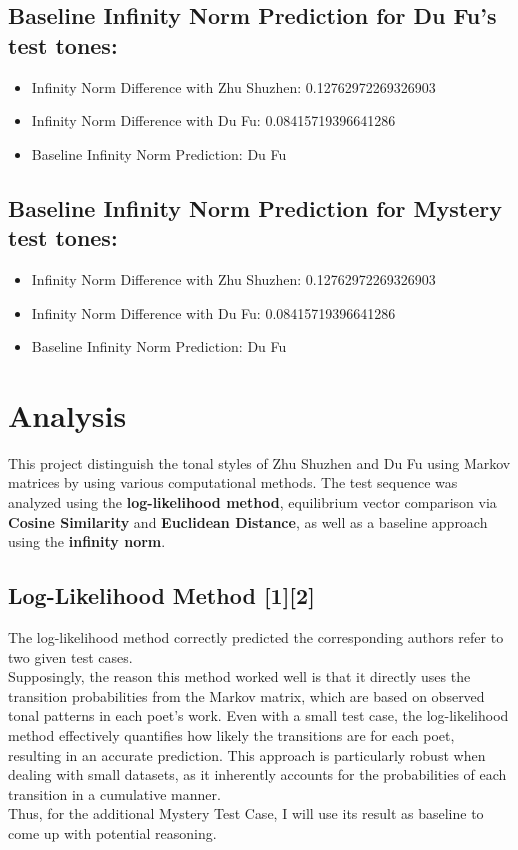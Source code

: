 \documentclass[12pt]{article}
\begin{document}
\subsection*{Baseline Infinity Norm Prediction for Du Fu's test tones:}


\begin{itemize}
    \item Infinity Norm Difference with Zhu Shuzhen: 0.12762972269326903
    \item Infinity Norm Difference with Du Fu: 0.08415719396641286
    \item Baseline Infinity Norm Prediction: Du Fu
\end{itemize}

\subsection*{Baseline Infinity Norm Prediction for Mystery test tones:}


\begin{itemize}
    \item Infinity Norm Difference with Zhu Shuzhen: 0.12762972269326903
    \item Infinity Norm Difference with Du Fu: 0.08415719396641286
    \item Baseline Infinity Norm Prediction: Du Fu
\end{itemize}

\section{Analysis}
This project distinguish the tonal styles of Zhu Shuzhen and Du Fu using Markov matrices by using various computational methods. The test sequence was analyzed using the \textbf{log-likelihood method}, equilibrium vector comparison via \textbf{Cosine Similarity} and \textbf{Euclidean Distance}, as well as a baseline approach using the \textbf{infinity norm}.

\subsection*{Log-Likelihood Method [1][2]}

The log-likelihood method correctly predicted the corresponding authors refer to two given test cases.
\\
Supposingly, the reason this method worked well is that it directly uses the transition probabilities from the Markov matrix, which are based on observed tonal patterns in each poet's work. Even with a small test case, the log-likelihood method effectively quantifies how likely the transitions are for each poet, resulting in an accurate prediction. 
This approach is particularly robust when dealing with small datasets, as it inherently accounts for the probabilities of each transition in a cumulative manner.
\\
Thus, for the additional Mystery Test Case, I will use its result as baseline to come up with potential reasoning.
\end{document}
